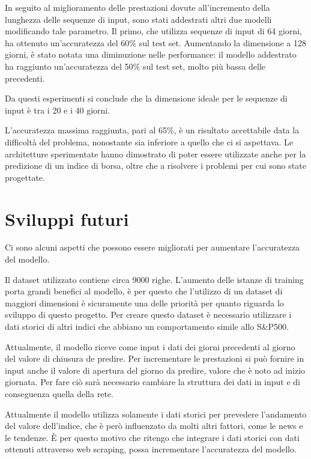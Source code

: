\documentclass[12pt,a4paper,twoside,openright]{book}
\begin{document}
In seguito al miglioramento delle prestazioni dovute all'incremento della lunghezza delle sequenze di input, sono stati addestrati altri due modelli modificando tale parametro.
Il primo, che utilizza sequenze di input di 64 giorni, ha ottenuto un'accuratezza del 60\% sul test set.
Aumentando la dimensione a 128 giorni, è stato notata una diminuzione nelle performance: il modello addestrato ha raggiunto un'accuratezza del 50\% sul test set, molto più bassa delle precedenti.

Da questi esperimenti si conclude che la dimensione ideale per le sequenze di input è tra i 20 e i 40 giorni.

L'accuratezza massima raggiunta, pari al 65\%, è un risultato accettabile data la difficoltà del problema, nonostante sia inferiore a quello che ci si aspettava. 
Le architetture sperimentate hanno dimostrato di poter essere utilizzate anche per la predizione di un indice di borsa, oltre che a risolvere i problemi per cui sono state progettate.


\section{Sviluppi futuri}
Ci sono alcuni aspetti che possono essere migliorati per aumentare l’accuratezza del modello.

Il dataset utilizzato contiene circa 9000 righe. L’aumento delle istanze di training porta grandi benefici al modello, è per questo che l’utilizzo di un dataset di maggiori dimensioni è sicuramente una delle priorità per quanto riguarda lo sviluppo di questo progetto. Per creare questo dataset è necessario utilizzare i dati storici di altri indici che abbiano un comportamento simile allo S\&P500.

Attualmente, il modello riceve come input i dati dei giorni precedenti al giorno del valore di chiusura de predire. Per incrementare le prestazioni si può fornire in input anche il valore di apertura del giorno da predire, valore che è noto ad inizio giornata. Per fare ciò sarà necessario cambiare la struttura dei dati in input e di conseguenza quella della rete.

Attualmente il modello utilizza solamente i dati storici per prevedere l’andamento del valore dell’indice, che è però influenzato da molti altri fattori, come le news e le tendenze. È per questo motivo che ritengo che integrare i dati storici con dati ottenuti attraverso web scraping, possa incrementare l’accuratezza del modello. \cite{DBLP:conf/ic3k/MoroPDPR17} \cite{DBLP:conf/ic3k/DomeniconiMPP17a}
\end{document}
